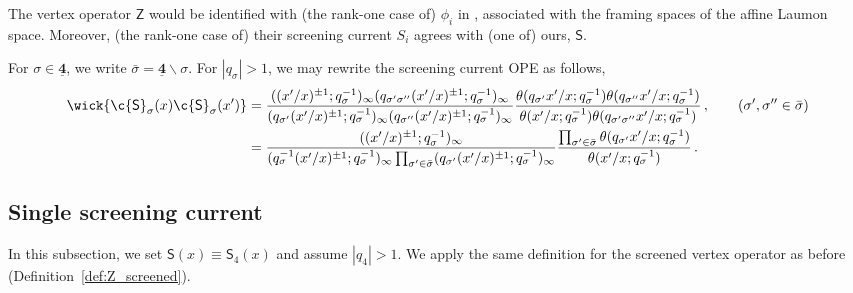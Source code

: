 \begin{remark}
    The vertex operator $\mathsf{Z}$ would be identified with (the rank-one case of) $\phi_i$ in \cite[\S2.3]{Shiraishi:2019JIS}, associated with the framing spaces of the affine Laumon space.
    Moreover, (the rank-one case of) their screening current $S_i$ agrees with (one of) ours, $\mathsf{S}$.
\end{remark}


\begin{lemma}\label{lemma:SS_A0^}
 For $\sigma \in \underline{\mathbf{4}}$, we write $\bar{\sigma} = \underline{\mathbf{4}} \backslash \sigma$.
 For $|q_\sigma| > 1$, we may rewrite the screening current OPE as follows,
 \begin{subequations}
  \begin{align}
   \wick{ \c {\mathsf{S}}_\sigma(x) \c {\mathsf{S}}_\sigma(x') } & = \frac{((x'/x)^{\pm 1};q_\sigma^{-1})_\infty (q_{\sigma'\sigma''} (x'/x)^{\pm 1};q_\sigma^{-1})_\infty}{(q_{\sigma'} (x'/x)^{\pm 1};q_\sigma^{-1})_\infty (q_{\sigma''} (x'/x)^{\pm 1};q_\sigma^{-1})_\infty} \frac{\theta(q_{\sigma'} x'/x;q_\sigma^{-1}) \theta(q_{\sigma''} x'/x;q_\sigma^{-1})}{\theta(x'/x;q_\sigma^{-1}) \theta(q_{\sigma'\sigma''} x'/x;q_\sigma^{-1})}
   \, ,
   \qquad (\sigma',\sigma'' \in \bar{\sigma}) \\
   & = \frac{((x'/x)^{\pm 1};q_\sigma^{-1})_\infty }{(q_\sigma^{-1} (x'/x)^{\pm 1};q_\sigma^{-1})_\infty \prod_{\sigma' \in \bar{\sigma}}(q_{\sigma'} (x'/x)^{\pm 1};q_\sigma^{-1})_\infty } \frac{\prod_{\sigma' \in \bar{\sigma}} \theta(q_{\sigma'} x'/x;q_\sigma^{-1})}{\theta(x'/x;q_\sigma^{-1})} \, .
  \end{align}
 \end{subequations}
\end{lemma}

\subsection{Single screening current}

In this subsection, we set $\mathsf{S}(x) \equiv \mathsf{S}_4(x)$ and assume $|q_4| > 1$.
We apply the same definition for the screened vertex operator as before (Definition~\ref{def:Z_screened}).

